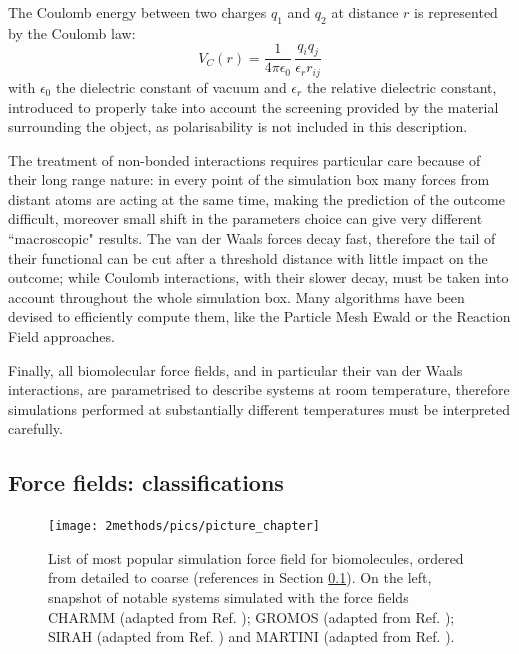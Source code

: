 The Coulomb energy between two charges $q_1$ and $q_2$ at distance $r$ is represented by the Coulomb law:
\begin{equation}
V_C(r) = \frac{1}{4 \pi \epsilon_0} \, \frac{q_i q_j}{\epsilon_r r_{ij}}
\end{equation}
with $\epsilon_0$ the dielectric constant of vacuum and $\epsilon_r$ the relative dielectric constant, introduced to properly take into account the screening provided by the material surrounding the object, as polarisability is not included in this description.

The treatment of non-bonded interactions requires particular care because of their long range nature: in every point of the simulation box many forces from distant atoms are acting at the same time, making the prediction of the outcome difficult, moreover small shift in the parameters choice can give very different ``macroscopic" results.
%
The van der Waals forces decay fast, therefore the tail of their functional can be cut after a threshold distance with little impact on the outcome; while Coulomb interactions, with their slower decay, must be taken into account throughout the whole simulation box. Many algorithms have been devised to efficiently compute them, like the Particle Mesh Ewald \cite{Essmann1995} or the Reaction Field \cite{Tironi1995} approaches.

Finally, all biomolecular force fields, and in particular their van der Waals interactions, are parametrised to describe systems at room temperature, therefore simulations performed at substantially different temperatures must be interpreted carefully.


\subsection{Force fields: classifications} \label{sec:ff_ex}

\begin{figure}[p!]
\centering
\texttt{[image: 2methods/pics/picture\_chapter]}
%
\caption[MD force field classifications]{List of most popular simulation force field for biomolecules, ordered from detailed to coarse (references in Section \ref{sec:ff_ex}). On the left, snapshot of notable systems simulated with the force fields CHARMM (adapted from Ref. \cite{Lipkin2017}); GROMOS (adapted from Ref. \cite{Macpherson2019}); SIRAH (adapted from Ref. \cite{Machado2017}) and MARTINI (adapted from Ref. \cite{Samsudin2017}).}
\label{fig:ff}
\end{figure}

